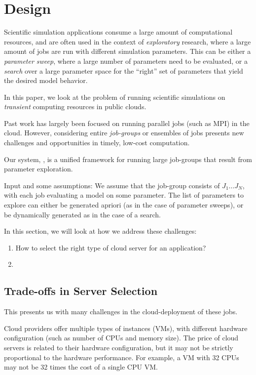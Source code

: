 \section{Design}

Scientific simulation applications consume a large amount of computational resources, and are often used in the context of \emph{exploratory} research, where a large amount of jobs are run with  different simulation parameters.
This can be either a \emph{parameter sweep}, where a large number of parameters need to be evaluated, or a \emph{search} over a large parameter space for the ``right'' set of parameters that yield the desired model behavior.

In this paper, we look at the problem of running scientific simulations on \emph{transient} computing resources in public clouds. 


Past work has largely been focused on running parallel jobs (such as MPI) in the cloud. 
However, considering entire \emph{job-groups} or ensembles of jobs presents new challenges and opportunities in timely, low-cost computation.

Our system, \sysname, is a unified framework for running large job-groups that result from parameter exploration. 

Input and some assumptions:
We assume that the job-group consists of $J_1\ldots J_N$, with each job evaluating a model on some parameter.
The list of parameters to explore can either be generated apriori (as in the case of parameter sweeps), or be dynamically generated as in the case of a search.

In this section, we will look at how we address these challenges:
\begin{enumerate}
\item How to select the right type of cloud server for an application?
\item 
\end{enumerate}



\subsection{Trade-offs in Server Selection}

This presents us with many challenges in the cloud-deployment of these jobs.

Cloud providers offer multiple types of instances (VMs), with different hardware configuration (such as number of CPUs and memory size).
The price of cloud servers is related to their hardware configuration, but it may not be strictly proportional to the hardware performance.
For example, a VM with 32 CPUs may not be 32 times the cost of a single CPU VM.



